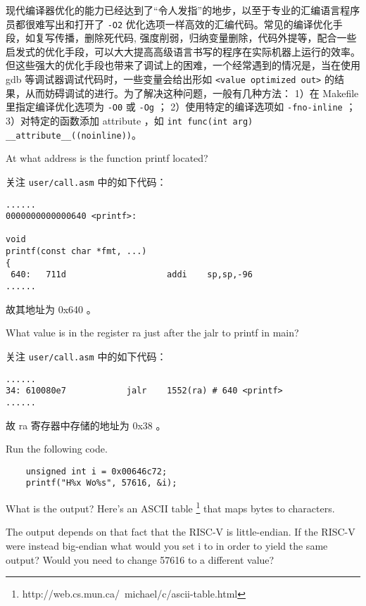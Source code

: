 \begin{theorem}[关于编译器优化]
    现代编译器优化的能力已经达到了“令人发指”的地步，以至于专业的汇编语言程序员都很难写出和打开了 \lstinline{-O2} 优化选项一样高效的汇编代码。常见的编译优化手段，如复写传播，删除死代码, 强度削弱，归纳变量删除，代码外提等，配合一些启发式的优化手段，可以大大提高高级语言书写的程序在实际机器上运行的效率。但这些强大的优化手段也带来了调试上的困难，一个经常遇到的情况是，当在使用 gdb 等调试器调试代码时，一些变量会给出形如 \lstinline{<value optimized out>} 的结果，从而妨碍调试的进行。为了解决这种问题，一般有几种方法： 1）在 Makefile 里指定编译优化选项为 \lstinline{-O0} 或 \lstinline{-Og} ； 2）使用特定的编译选项如 \lstinline{-fno-inline} ；3）对特定的函数添加 attribute ，如 \lstinline{int func(int arg) __attribute__((noinline))}。
\end{theorem}

\begin{exercise}
    At what address is the function printf located?
\end{exercise}

\begin{solution}
关注 \lstinline{user/call.asm} 中的如下代码：
\begin{lstlisting}
......
0000000000000640 <printf>:

void
printf(const char *fmt, ...)
{
 640:	711d                	addi	sp,sp,-96
......
\end{lstlisting}

故其地址为 0x640 。
\end{solution}

\begin{exercise}
    What value is in the register ra just after the jalr to printf in main?
\end{exercise}

\begin{solution}
关注 \lstinline{user/call.asm} 中的如下代码：
\begin{lstlisting}
......
34:	610080e7          	jalr	1552(ra) # 640 <printf>
......
\end{lstlisting}

故 ra 寄存器中存储的地址为 0x38 。
\end{solution}

\begin{exercise}
Run the following code.
\begin{lstlisting}
	unsigned int i = 0x00646c72;
	printf("H%x Wo%s", 57616, &i);
\end{lstlisting}
What is the output? Here's an ASCII table \footnote{http://web.cs.mun.ca/~michael/c/ascii-table.html} that maps bytes to characters.

The output depends on that fact that the RISC-V is little-endian. If the RISC-V were instead big-endian what would you set i to in order to yield the same output? Would you need to change 57616 to a different value?
\end{exercise}


